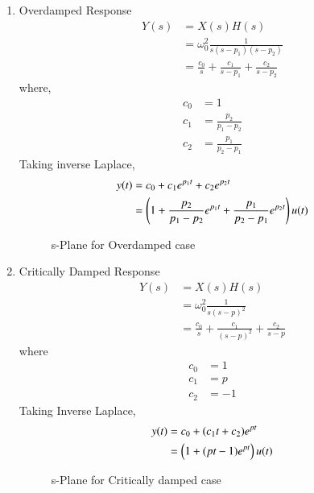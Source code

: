 \documentclass[journal,12pt,twocolumn]{IEEEtran}
\theoremstyle{remark}
\begin{document}
\begin{enumerate}
\item Overdamped Response
\begin{align}
    Y(s) &= X(s)H(s)\\
    &= \omega_0^2\frac{1}{s(s-p_1)(s-p_2)}\\
    &= \frac{c_0}{s} + \frac{c_1}{s-p_1} + \frac{c_2}{s-p_2}
\end{align}
where,
\begin{align}
    c_0 &= 1\\
    c_1 &= \frac{p_2}{p_1 - p_2}\\
    c_2 &= \frac{p_1}{p_2 - p_1}
\end{align}
Taking inverse Laplace,
\begin{align}
    y(t) &= c_0 + c_1e^{p_1t} + c_2e^{p_2t}\\
    &= \left(1 + \frac{p_2}{p_1 - p_2}e^{p_1t} +  \frac{p_1}{p_2 - p_1}e^{p_2t}\right)u(t)
\end{align}

\begin{figure}[!ht]
    \centering
    
    \caption{s-Plane for Overdamped case}
\end{figure}

\item Critically Damped Response
\begin{align}
    Y(s)&=X(s)H(s)\\
    &= \omega_0^2\frac{1}{s(s-p)^2}\\
    &= \frac{c_0}{s}+\frac{c_1}{\left(s-p\right)^2}+\frac{c_2}{s-p}
\end{align}
where
\begin{align}
    c_0 &= 1\\
    c_1 &= p\\
    c_2 &= -1
\end{align}
Taking Inverse Laplace,
\begin{align}
    y(t) &= c_0+(c_1t+c_2)e^{pt}\\
    &= \left(1+(pt-1)e^{pt}\right)u(t)
\end{align}
\begin{figure}[!ht]
    \centering
    
    \caption{s-Plane for Critically damped case}
\end{figure}


\end{enumerate}
\end{document}
